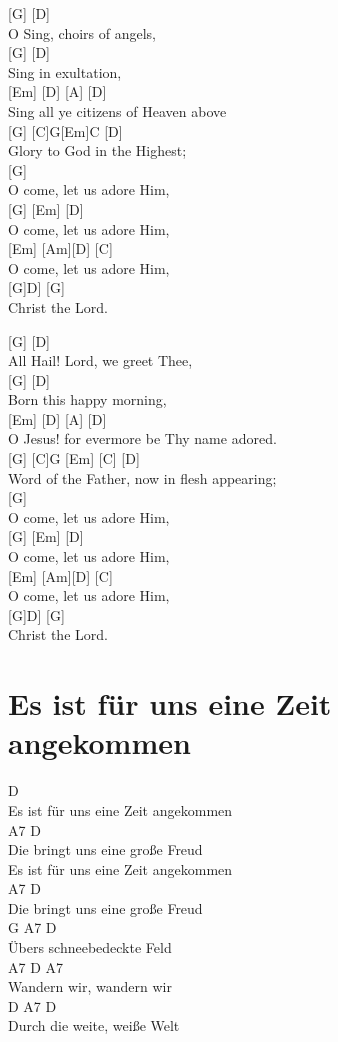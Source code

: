 \documentclass[
  letterpaper,
]{scrbook}
\begin{document}
{[}G{]} {[}D{]}\\
O Sing, choirs of angels,\\
{[}G{]} {[}D{]}\\
Sing in exultation,\\
{[}Em{]} {[}D{]} {[}A{]} {[}D{]}\\
Sing all ye citizens of Heaven above\\
{[}G{]} {[}C{]}G{[}Em{]}C {[}D{]}\\
Glory to God in the Highest;\\
{[}G{]}\\
O come, let us adore Him,\\
{[}G{]} {[}Em{]} {[}D{]}\\
O come, let us adore Him,\\
{[}Em{]} {[}Am{]}{[}D{]} {[}C{]}\\
O come, let us adore Him,\\
{[}G{]}D{]} {[}G{]}\\
Christ the Lord.

{[}G{]} {[}D{]}\\
All Hail! Lord, we greet Thee,\\
{[}G{]} {[}D{]}\\
Born this happy morning,\\
{[}Em{]} {[}D{]} {[}A{]} {[}D{]}\\
O Jesus! for evermore be Thy name adored.\\
{[}G{]} {[}C{]}G {[}Em{]} {[}C{]} {[}D{]}\\
Word of the Father, now in flesh appearing;\\
{[}G{]}\\
O come, let us adore Him,\\
{[}G{]} {[}Em{]} {[}D{]}\\
O come, let us adore Him,\\
{[}Em{]} {[}Am{]}{[}D{]} {[}C{]}\\
O come, let us adore Him,\\
{[}G{]}D{]} {[}G{]}\\
Christ the Lord.

\hypertarget{es-ist-fuxfcr-uns-eine-zeit-angekommen}{%
\chapter{Es ist für uns eine Zeit
angekommen}\label{es-ist-fuxfcr-uns-eine-zeit-angekommen}}

D\\
Es ist für uns eine Zeit angekommen\\
A7 D\\
Die bringt uns eine große Freud\\
Es ist für uns eine Zeit angekommen\\
A7 D\\
Die bringt uns eine große Freud\\
G A7 D\\
Übers schneebedeckte Feld\\
A7 D A7\\
Wandern wir, wandern wir\\
D A7 D\\
Durch die weite, weiße Welt
\end{document}
